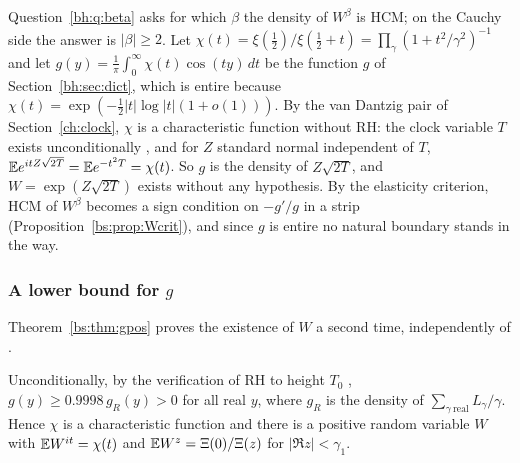 Question~\ref{bh:q:beta} asks for which $\beta$ the density of $W^\beta$ is HCM; on the Cauchy side the answer is $|\beta|\ge2$. Let $\chi(t)=\xi(\frac12)/\xi(\frac12+t)=\prod_\gamma(1+t^2/\gamma^2)^{-1}$ and let $g(y)=\frac1\pi\int_0^\infty\chi(t)\cos(ty)\,dt$ be the function $g$ of Section~\ref{bh:sec:dict}, which is entire because $\chi(t)=\exp(-\frac12|t|\log|t|(1+o(1)))$. By the van Dantzig pair of Section~\ref{ch:clock}, $\chi$ is a characteristic function without RH: the clock variable $T$ exists unconditionally \cite[Theorem A]{P26}, and for $Z$ standard normal independent of $T$, $\mathbb{E} e^{itZ\sqrt{2T}}=\mathbb{E} e^{-t^2T}=\chi(t)$. So $g$ is the density of $Z\sqrt{2T}$, and $W=\exp(Z\sqrt{2T})$ exists without any hypothesis. By the elasticity criterion, HCM of $W^\beta$ becomes a sign condition on $-g'/g$ in a strip (Proposition~\ref{bs:prop:Wcrit}), and since $g$ is entire no natural boundary stands in the way.

\subsubsection{A lower bound for $g$}

Theorem~\ref{bs:thm:gpos} proves the existence of $W$ a second time, independently of \cite[Theorem A]{P26}.

\begin{theorem}\label{bs:thm:gpos}
Unconditionally, by the verification of RH to height $T_0$ \cite{PT21}, $g(y)\ge0.9998\,g_R(y)>0$ for all real $y$, where $g_R$ is the density of $\sum_{\gamma\ \mathrm{real}}L_\gamma/\gamma$. Hence $\chi$ is a characteristic function and there is a positive random variable $W$ with $\mathbb{E} W^{it}=\chi(t)$ and $\mathbb{E} W^z=\Xi(0)/\Xi(z)$ for $|\Re z|<\gamma_1$.
\end{theorem}

